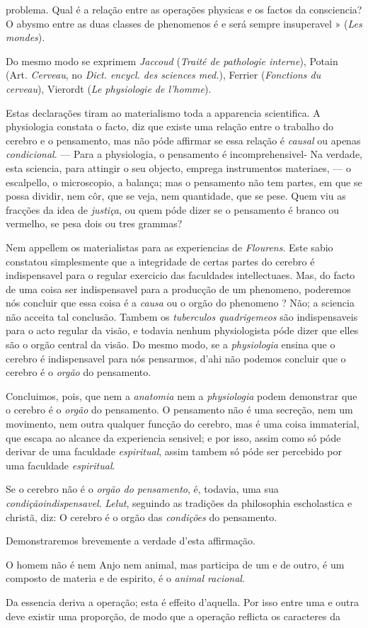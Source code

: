 problema. Qual é a relação entre as operações physicas e os factos da consciencia? O abysmo entre as duas classes de phenomenos é e será sempre insuperavel » (\emph{Les mondes}).\par Do mesmo modo se exprimem \emph{Jaccoud} (\emph{Traité de pathologie interne}), Potain (Art. \emph{Cerveau}, no \emph{Dict. encycl. des sciences med.}), Ferrier (\emph{Fonctions du cerveau}), Vierordt (\emph{Le physiologie de l'homme}).\par Estas declarações tiram ao materialismo toda a apparencia scientifica. A physiologia constata o facto, diz que existe uma relação entre o trabalho do cerebro e o pensamento, mas não póde affirmar se essa relação é \emph{causal} ou apenas \emph{condicional}. --- Para a physiologia, o pensamento é incomprehensivel- Na verdade, esta sciencia, para attingir o seu objecto, emprega instrumentos materiaes, --- o escalpello, o microscopio, a balança; mas o pensamento não tem partes, em que se possa dividir, nem côr, que se veja, nem quantidade, que se pese. Quem viu as fracções da idea de \emph{justiça}, ou quem póde dizer se o pensamento é branco ou vermelho, se pesa dois ou tres grammas?\par Nem appellem os materialistas para as experiencias de \emph{Flourens}. Este sabio constatou simplesmente que a integridade de certas partes do cerebro é indispensavel para o regular exercicio das faculdades intellectuaes. Mas, do facto de uma coisa ser indispensavel para a producção de um phenomeno, poderemos nós concluir que essa coisa é a \emph{causa} ou o orgão do phenomeno ? Não; a sciencia não acceita tal conclusão. Tambem os \emph{tuberculos quadrigemeos} são indispensaveis para o acto regular da visão, e todavia nenhum physiologista póde dizer que elles são o orgão central da visão. Do mesmo modo, se a \emph{physiologia} ensina que o cerebro é indispensavel para nós pensarmos, d'ahi não podemos concluir que o cerebro é o \emph{orgão} do pensamento.\par Concluimos, pois, que nem a \emph{anatomia} nem a \emph{physiologia} podem demonstrar que o cerebro é o \emph{orgão} do pensamento. O pensamento não é uma secreção, nem um movimento, nem outra qualquer funcção do cerebro, mas é uma coisa immaterial, que escapa ao alcance da experiencia sensivel; e por isso, assim como só póde derivar de uma faculdade \emph{espiritual}, assim tambem só póde ser percebido por uma faculdade \emph{espiritual}.\par Se o cerebro não é o \emph{orgão do pensamento}, é, todavia, uma sua \emph{condição}\emph{indispensavel}. \emph{Lelut}, seguindo as tradições da philosophia escholastica e christã, diz: O cerebro é o orgão das \emph{condições} do pensamento.\par Demonstraremos brevemente a verdade d'esta affirmação.\par O homem não é nem Anjo nem animal, mas participa de um e de outro, é um composto de materia e de espirito, é o \emph{animal racional}.\par Da essencia deriva a operação; esta é effeito d'aquella. Por isso entre uma e outra deve existir uma proporção, de modo que a operação reflicta os caracteres da 